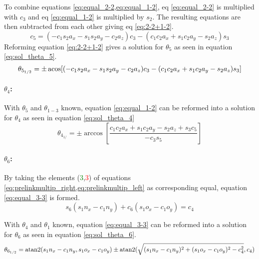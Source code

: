 To combine equations \cref{eq:equal_2-2,eq:equal_1-2}, eq \ref{eq:equal_2-2} is multiplied with $c_3$ and eq \ref{eq:equal_1-2} is multiplied by $ s_2$. The resulting equations are then subtracted from each other giving eq \ref{eq:2-2+1-2}.
\begin{equation}\label{eq:2-2+1-2}
	c_5 = (-c_1 s_2 a_x - s_1 s_2 a_y -c_2 a_z) c_3 - (c_1 c_2 a_x +s_1 c_2 a_y - s_2 a_z) s_3
\end{equation}
Reforming equation \ref{eq:2-2+1-2} gives a solution for $\theta_5$ as seen in equation \ref{eq:sol_theta_5}.
\begin{equation}\label{eq:sol_theta_5}
	\theta_{5_{1/2}} = \pm \operatorname{acos} [ ( -c_1 s_2 a_x - s_1 s_2 a_y - c_2 a_z) c_3 - (c_1 c_2 a_x + s_1 c_2 a_y - s_2 a_z) s_3]
\end{equation}

\paragraph{$\theta_4$:}

With $\theta_5$ and $\theta_{1-3}$ known, equation \ref{eq:equal_1-2} can be reformed into a solution for $\theta_4$ as seen in equation \ref{eq:sol_theta_4}
\begin{equation}\label{eq:sol_theta_4}
	\theta_{4_{1/}} = \pm \arccos [ \frac{ c_1 c_2 a_x + s_1 c_2 a_y - s_2 a_z + s_3 c_5}{-c_3 s_5}]
\end{equation}

\paragraph{$\theta_6$:}
By taking the elements (\textcolor{green}{3},\textcolor{red}{3}) of equations \cref{eq:prelinkmultip_right,eq:prelinkmultip_left} as corresponding equal, equation \ref{eq:equal_3-3} is formed.
\begin{equation} \label{eq:equal_3-3}
	s_6 (s_1 n_x - c_1 n_y) + c_6 (s_1 o_x - c_1 o_y ) = c_4
\end{equation}

With $\theta_4$ and $\theta_1$ known, equation \ref{eq:equal_3-3} can be reformed into a solution for $\theta_6$ as seen in equation \ref{eq:sol_theta_6}.
\begin{equation}\label{eq:sol_theta_6}
	\theta_{6_{1/2}} = \operatorname{atan2}(s_1 n_x -c_1 n_y , s_1 o_x -c_1 o_y) \pm \operatorname{atan2}(\sqrt{(s_1 n_x - c_1 n_y)^2 + (s_1 o_x - c_1 o_y )^2 - c_4^2} , c_4)
\end{equation}

